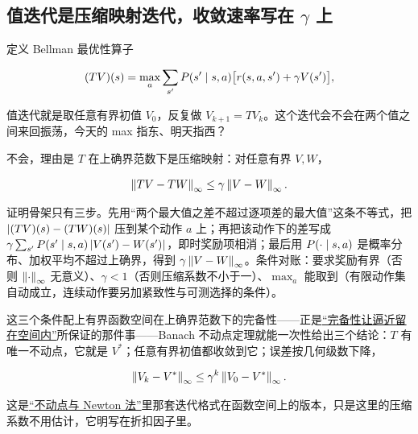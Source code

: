 \subsection{值迭代是压缩映射迭代，收敛速率写在 \texorpdfstring{\(\gamma\)}{gamma} 上}

定义 Bellman 最优性算子

\[
(TV)(s) = \max_a \sum_{s'} P(s' \mid s, a)
\bigl[ r(s, a, s') + \gamma V(s') \bigr],
\]

值迭代就是取任意有界初值 \(V_0\)，反复做 \(V_{k+1}=TV_k\)。这个迭代会不会在两个值之间来回振荡，今天的 max 指东、明天指西？

不会，理由是 \(T\) 在上确界范数下是压缩映射：对任意有界 \(V,W\)，

\[
\left\lVert TV - TW\right\rVert_\infty \le \gamma \left\lVert V - W\right\rVert_\infty.
\]

证明骨架只有三步。先用``两个最大值之差不超过逐项差的最大值''这条不等式，把 \(\left|(TV)(s)-(TW)(s)\right|\) 压到某个动作 \(a\) 上；再把该动作下的差写成 \(\gamma\sum_{s'}P(s'\mid s,a)\left|V(s')-W(s')\right|\)，即时奖励项相消；最后用 \(P(\cdot\mid s,a)\) 是概率分布、加权平均不超过上确界，得到 \(\gamma\left\lVert V-W\right\rVert_\infty\)。条件对账：要求奖励有界（否则 \(\left\lVert\cdot\right\rVert_\infty\) 无意义）、\(\gamma<1\)（否则压缩系数不小于一）、\(\max_a\) 能取到（有限动作集自动成立，连续动作要另加紧致性与可测选择的条件）。

这三个条件配上有界函数空间在上确界范数下的完备性——正是\hyperref[sec:12-Real-Analysis-Support/03-Topology-Basics/03]{``完备性让逼近留在空间内''}所保证的那件事——Banach 不动点定理就能一次性给出三个结论：\(T\) 有唯一不动点，它就是 \(V^*\)；任意有界初值都收敛到它；误差按几何级数下降，

\[
\left\lVert V_k - V^*\right\rVert_\infty \le \gamma^k \left\lVert V_0 - V^*\right\rVert_\infty.
\]

这是\hyperref[sec:08-Numerical-Analysis/02-Root-Finding/02]{``不动点与 Newton 法''}里那套迭代格式在函数空间上的版本，只是这里的压缩系数不用估计，它明写在折扣因子里。


